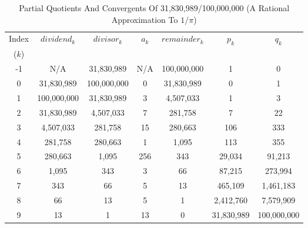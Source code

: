 \documentclass{esub2acm}
\begin{document}
\begin{table}
\caption{Partial Quotients And Convergents Of 31,830,989/100,000,000
        (A Rational Approximation To $1/ \pi$)}
\label{tbl:cfexpansraponeoverpi}
\begin{center}
\begin{tabular}{|c|c|c|c|c|c|c|}
\hline
\small{Index} & \small{$dividend_k$}  & \small{$divisor_k$} & \small{$a_k$}   & \small{$remainder_k$} & \small{$p_k$}      & \small{$q_k$}       \\
\small{($k$)} &                       &                     &                 &                       &                    &                     \\
\hline
\hline
\small{-1}    & \small{N/A}           & \small{31,830,989}  & \small{N/A}     & \small{100,000,000}   & \small{1}          & \small{0}           \\
\hline
\small{0}     & \small{31,830,989}    & \small{100,000,000} & \small{0}       & \small{31,830,989}    & \small{0}          & \small{1}           \\
\hline
\small{1}     & \small{100,000,000}   & \small{31,830,989}  & \small{3}       & \small{4,507,033}     & \small{1}          & \small{3}           \\
\hline
\small{2}     & \small{31,830,989}    & \small{4,507,033}   & \small{7}       & \small{281,758}       & \small{7}          & \small{22}          \\
\hline
\small{3}     & \small{4,507,033}     & \small{281,758}     & \small{15}      & \small{280,663}       & \small{106}        & \small{333}         \\
\hline
\small{4}     & \small{281,758}       & \small{280,663}     & \small{1}       & \small{1,095}         & \small{113}        & \small{355}         \\
\hline
\small{5}     & \small{280,663}       & \small{1,095}       & \small{256}     & \small{343}           & \small{29,034}     & \small{91,213}      \\
\hline
\small{6}     & \small{1,095}         & \small{343}         & \small{3}       & \small{66}            & \small{87,215}     & \small{273,994}     \\
\hline
\small{7}     & \small{343}           & \small{66}          & \small{5}       & \small{13}            & \small{465,109}    & \small{1,461,183}   \\
\hline
\small{8}     & \small{66}            & \small{13}          & \small{5}       & \small{1}             & \small{2,412,760}  & \small{7,579,909}   \\
\hline
\small{9}     & \small{13}            & \small{1}           & \small{13}      & \small{0}             & \small{31,830,989} & \small{100,000,000} \\
\hline
\end{tabular}
\end{center}
\end{table}
\end{document}
